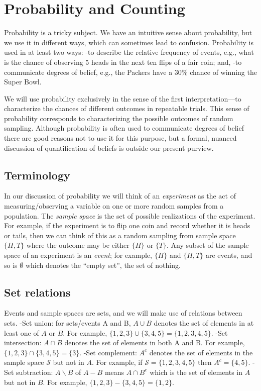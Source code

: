 \documentclass[
]{book}
\begin{document}
\hypertarget{probability-and-counting}{%
\chapter{Probability and Counting}\label{probability-and-counting}}

Probability is a tricky subject. We have an intuitive sense about probability, but we use it in different ways, which can sometimes lead to confusion. Probability is used in at least two ways:
-to describe the relative frequency of events, e.g., what is the chance of observing 5 heads in the next ten flips of a fair coin; and,
-to communicate degrees of belief, e.g., the Packers have a 30\% chance of winning the Super Bowl.

We will use probability exclusively in the sense of the first interpretation---to characterize the chances of different outcomes in repeatable trials. This sense of probability corresponds to characterizing the possible outcomes of random sampling. Although probability is often used to communicate degrees of belief there are good reasons not to use it for this purpose, but a formal, nuanced discussion of quantification of beliefs is outside our present purview.

\hypertarget{terminology}{%
\section{Terminology}\label{terminology}}

In our discussion of probability we will think of an \emph{experiment} as the act of measuring/observing a variable on one or more random samples from a population. The \emph{sample space} is the set of possible realizations of the experiment. For example, if the experiment is to flip one coin and record whether it is heads or tails, then we can think of this as a random sampling from sample space \(\{H, T\}\) where the outcome may be either \(\{H\}\) or \(\{T\}\). Any subset of the sample space of an experiment is an \emph{event}; for example, \(\{H\}\) and \(\{H,T\}\) are events, and so is \(\emptyset\) which denotes the ``empty set'', the set of nothing.

\hypertarget{set-relations}{%
\section{Set relations}\label{set-relations}}

Events and sample spaces are sets, and we will make use of relations between sets.
-Set union: for sets/events A and B, \(A\cup B\) denotes the set of elements in at least one of \(A\) or \(B\). For example, \(\{1,2,3\}\cup\{3,4,5\} = \{1,2,3,4,5\}\).
-Set intersection: \(A\cap B\) denotes the set of elements in both A and B. For example, \(\{1,2,3\}\cap\{3,4,5\} = \{3\}\).
-Set complement: \(A^c\) denotes the set of elements in the sample space \(\mathcal{S}\) but not in \(A\). For example, if \(\mathcal{S} = \{1,2,3,4,5\}\) then \(A^c = \{4,5\}\).
-Set subtraction: \(A\backslash B\) of \(A-B\) means \(A\cap B^c\) which is the set of elements in \(A\) but not in \(B\). For example, \(\{1,2,3\}-\{3,4,5\} = \{1,2\}\).\\
\end{document}
